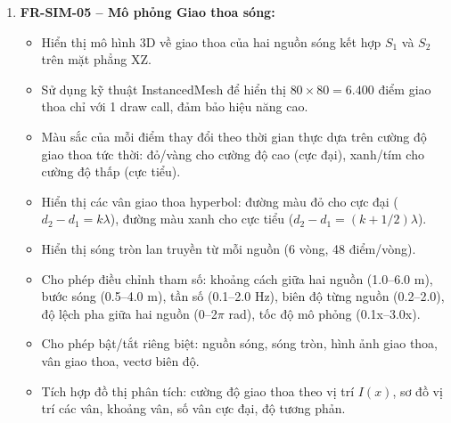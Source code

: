 \begin{enumerate}
    \item \textbf{FR-SIM-05 – Mô phỏng Giao thoa sóng:}
    \begin{itemize}
        \item Hiển thị mô hình 3D về giao thoa của hai nguồn sóng kết hợp $S_1$ và $S_2$ trên mặt phẳng XZ.
        \item Sử dụng kỹ thuật InstancedMesh để hiển thị $80 \times 80 = 6.400$ điểm giao thoa chỉ với 1 draw call, đảm bảo hiệu năng cao.
        \item Màu sắc của mỗi điểm thay đổi theo thời gian thực dựa trên cường độ giao thoa tức thời: đỏ/vàng cho cường độ cao (cực đại), xanh/tím cho cường độ thấp (cực tiểu).
        \item Hiển thị các vân giao thoa hyperbol: đường màu đỏ cho cực đại ($d_2 - d_1 = k\lambda$), đường màu xanh cho cực tiểu ($d_2 - d_1 = (k+1/2)\lambda$).
        \item Hiển thị sóng tròn lan truyền từ mỗi nguồn (6 vòng, 48 điểm/vòng).
        \item Cho phép điều chỉnh tham số: khoảng cách giữa hai nguồn (1.0–6.0 m), bước sóng (0.5–4.0 m), tần số (0.1–2.0 Hz), biên độ từng nguồn (0.2–2.0), độ lệch pha giữa hai nguồn (0–2$\pi$ rad), tốc độ mô phỏng (0.1x–3.0x).
        \item Cho phép bật/tắt riêng biệt: nguồn sóng, sóng tròn, hình ảnh giao thoa, vân giao thoa, vectơ biên độ.
        \item Tích hợp đồ thị phân tích: cường độ giao thoa theo vị trí $I(x)$, sơ đồ vị trí các vân, khoảng vân, số vân cực đại, độ tương phản.
    \end{itemize}
    

\end{enumerate}
